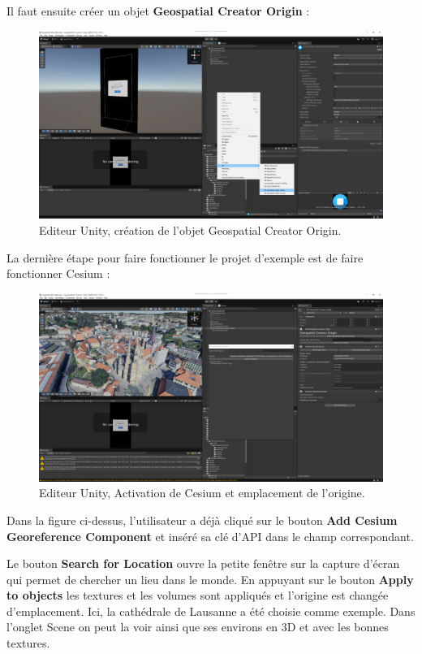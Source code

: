 Il faut ensuite créer un objet \textbf{Geospatial Creator Origin} :
\begin{figure}[H]
    \centering
    \includegraphics[width=1\linewidth]{assets/figures/Screenshots/GGC_2.png}
    \caption{Editeur Unity, création de l'objet Geospatial Creator Origin.}
    \label{fig:GGC_2}
\end{figure}

La dernière étape pour faire fonctionner le projet d'exemple est de faire fonctionner Cesium :

\begin{figure}[H]
    \centering
    \includegraphics[width=1\linewidth]{assets/figures/Screenshots/GGC_5.png}
    \caption{Editeur Unity, Activation de Cesium et emplacement de l'origine.}
    \label{fig:GGC_5}
\end{figure}

Dans la figure ci-dessus, l'utilisateur a déjà cliqué sur le bouton \textbf{Add Cesium Georeference Component} et inséré sa clé d'API dans le champ correspondant.

Le bouton \textbf{Search for Location} ouvre la petite fenêtre sur la capture d'écran qui permet de chercher un lieu dans le monde. En appuyant sur le bouton \textbf{Apply to objects}
les textures et les volumes sont appliqués et l'origine est changée d'emplacement.
Ici, la cathédrale de Lausanne a été choisie comme exemple. Dans l'onglet Scene on peut la voir ainsi que ses environs en 3D et avec les bonnes textures.

